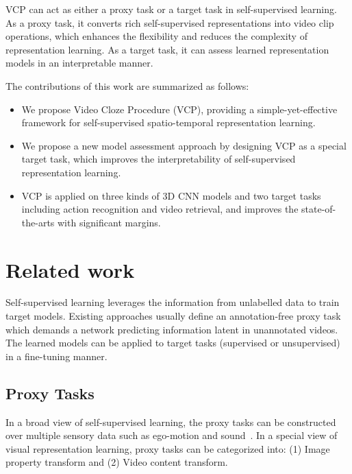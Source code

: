 \documentclass[letterpaper]{article}
\begin{document}
VCP can act as either a proxy task or a target task in self-supervised learning. As a proxy task, it converts rich self-supervised representations into video clip operations, which enhances the flexibility and reduces the complexity of representation learning. As a target task, it can assess learned representation models in an interpretable manner. 


The contributions of this work are summarized as follows:
\begin{itemize}

    \item We propose Video Cloze Procedure (VCP), providing a simple-yet-effective framework for self-supervised spatio-temporal representation learning.

    \item We propose a new model assessment approach by designing VCP as a special target task, which improves the interpretability of self-supervised representation learning. 
    \item VCP is applied on three kinds of 3D CNN models and two target tasks including action recognition and video retrieval, and improves the state-of-the-arts with significant margins.
\end{itemize}

\section{Related work}
Self-supervised learning leverages the information from unlabelled data to train target models. Existing approaches usually define an annotation-free proxy task which demands a network predicting information latent in unannotated videos.
The learned models can be applied to target tasks (supervised or unsupervised) in a fine-tuning manner.
\subsection{Proxy Tasks} 
In a broad view of self-supervised learning, the proxy tasks can be constructed over multiple sensory data such as ego-motion and sound~\cite{SeeByMoving2015,AutoEncoding14,EgoMotion2017,LookListenLearn2016,LookListenLearn2017}. In a special view of visual representation learning, proxy tasks can be categorized into: (1) Image property transform and (2) Video content transform.
\end{document}
